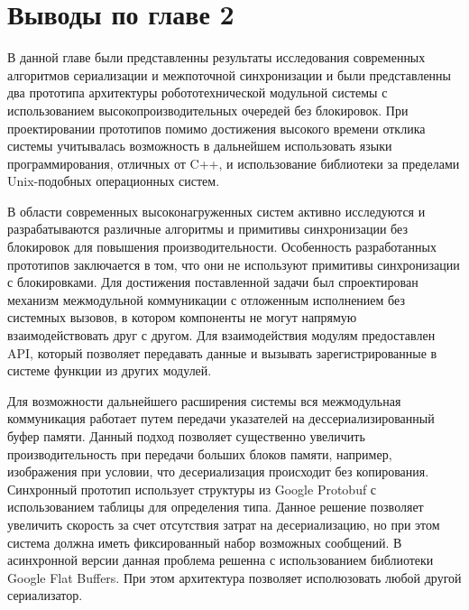 \section*{Выводы по главе 2}

В данной главе были представленны результаты исследования современных 
алгоритмов сериализации и межпоточной синхронизации и были представленны два 
прототипа архитектуры робототехнической модульной системы с использованием 
высокопроизводительных очередей без блокировок. При проектировании прототипов 
помимо достижения высокого времени отклика системы учитывалась возможность в 
дальнейшем использовать языки программирования, отличных от C++, и 
использование библиотеки за пределами Unix-подобных операционных систем.

В области современных высоконагруженных систем активно исследуются и разрабатываются различные алгоритмы и примитивы синхронизации без блокировок для повышения производительности.  Особенность разработанных прототипов заключается в том, что они не используют примитивы синхронизации с блокировками. Для достижения поставленной задачи был спроектирован механизм межмодульной коммуникации с отложенным исполнением без системных вызовов, в котором компоненты не могут напрямую взаимодействовать друг с другом. Для взаимодействия модулям предоставлен API, который позволяет передавать данные и вызывать зарегистрированные в системе функции из других модулей.

Для возможности дальнейшего расширения системы вся межмодульная коммуникация работает путем передачи указателей на дессериализированный буфер памяти. Данный подход позволяет существенно увеличить производительность при передачи больших блоков памяти, например, изображения при условии, что десериализация происходит без копирования. Синхронный прототип использует структуры из Google Protobuf с использованием таблицы для определения типа. Данное решение позволяет увеличить скорость за счет отсутствия затрат на десериализацию, но при этом система должна иметь фиксированный набор возможных сообщений. В асинхронной версии данная проблема решенна с использованием библиотеки Google Flat Buffers. При этом архитектура позволяет исполюзовать любой другой сериализатор.